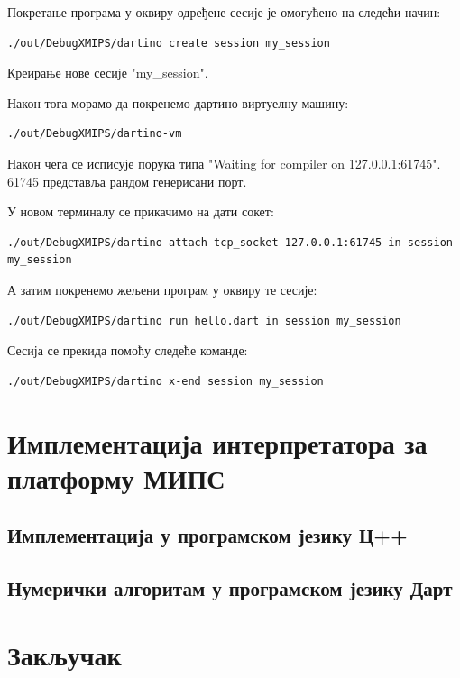 \documentclass[12pt,oneside]{memoir}
\begin{document}
Покретање програма у оквиру одређене сесије је омогућено на следећи начин: 

\begin{verbatim}
./out/DebugXMIPS/dartino create session my_session
\end{verbatim}
Креирање нове сесије "my\_session".

Након тога морамо да покренемо дартино виртуелну машину:
\begin{verbatim}
./out/DebugXMIPS/dartino-vm
\end{verbatim}
Након чега се исписује порука типа "Waiting for compiler on 127.0.0.1:61745". 61745 представља рандом генерисани порт.

У новом терминалу се прикачимо на дати сокет:
\begin{verbatim}
./out/DebugXMIPS/dartino attach tcp_socket 127.0.0.1:61745 in session my_session
\end{verbatim} 

А затим покренемо жељени програм у оквиру те сесије:
\begin{verbatim}
./out/DebugXMIPS/dartino run hello.dart in session my_session
\end{verbatim}

Сесија се прекида помоћу следеће команде:
\begin{verbatim}
./out/DebugXMIPS/dartino x-end session my_session
\end{verbatim}


\chapter{Имплементација интерпретатора за платформу МИПС}
\label{chp:implementacija}

\section{Имплементација у програмском језику Ц++}


\section{Нумерички алгоритам у програмском језику Дарт}


\chapter{Закључак}
\end{document}
